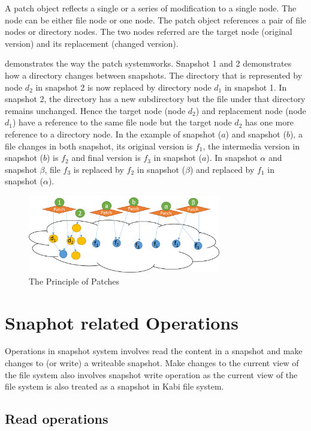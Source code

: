     A patch object reflects a single or a series of modification to a single node. The node can be either file node or one node. The patch object references a pair of file nodes or directory nodes. The two nodes referred are the target node (original version) and its replacement (changed version).

     demonstrates the way the patch systemworks. Snapshot 1 and 2 demonstrates how a directory changes between snapshots. The directory that is represented by node $d_2$ in snapshot 2 is now replaced by directory node $d_1$ in snapshot 1. In snapshot 2, the directory has a new subdirectory but the file under that directory remains unchanged. Hence the target node (node $d_2$) and replacement node (node $d_1$) have a reference to the same file node but the target node $d_2$ has one more reference to a directory node. In the example of snapshot ($a$) and snapshot ($b$), a file changes in both snapshot, its original version is $f_1$, the intermedia version in snapshot ($b$) is $f_2$ and final version is $f_3$ in snapshot ($a$). In snapshot $\alpha$ and snapshot $\beta$, file $f_3$ is replaced by $f_2$ in snapshot ($\beta$) and replaced by $f_1$ in snapshot ($\alpha$).  

\begin{figure}[hbtp]
\centering
\includegraphics[width=0.75\textwidth]{Chapter-4/figs/fig14.png}
\caption{The Principle of Patches}
\label{fig:patches}
\end{figure}

\section{Snaphot related Operations}

    Operations in snapshot system involves read the content in a snapshot and make changes to (or write) a writeable snapshot. Make changes to the current view of the file system also involves snapshot write operation as the current view of the file system is also treated as a snapshot in Kabi file system.

\subsection{Read operations}

